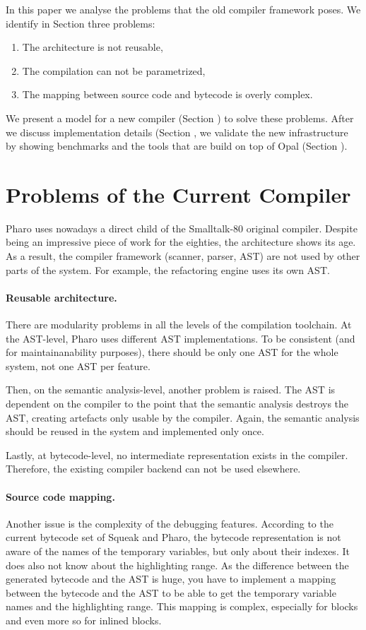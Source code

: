 \documentclass[preprint,10pt]{sigplanconf}
\begin{document}
In this paper we analyse the problems that the old compiler framework poses. We identify in Section  three
problems:
\begin{enumerate}
\item The architecture is not reusable,
\item The compilation can not be parametrized,
\item The mapping between source code and bytecode is overly complex.
\end{enumerate}

We present a model for a new compiler (Section ) to solve these problems. After we discuss implementation details (Section , we validate the new infrastructure by
showing benchmarks and the tools that are build on top of Opal (Section ).


\section{Problems of the Current Compiler}
\label{sec:problem}

Pharo uses nowadays a direct child of the Smalltalk-80 original compiler. Despite being an impressive piece of work for the eighties, the architecture shows its age. As a result, the compiler framework (scanner, parser, AST) are not used by other parts of the system. For example, the refactoring engine uses its own AST.

\paragraph{Reusable architecture.} There are modularity problems in all the levels of the compilation toolchain. At the AST-level, Pharo uses different AST implementations. To be consistent (and for maintainanability purposes), there should be only one AST for the whole system, not one AST per feature. 

Then, on the semantic analysis-level, another problem is raised. The AST is dependent on the compiler to the point that the semantic analysis destroys the AST, creating artefacts only usable by the compiler. Again, the semantic analysis should be reused in the system and implemented only once. 

Lastly, at bytecode-level, no intermediate representation exists in the compiler. Therefore, the existing compiler backend can not be used elsewhere.

\paragraph{Source code mapping.} Another issue is the complexity of the debugging features.
According to the current bytecode set of Squeak and Pharo, the bytecode representation is not aware of the names of the temporary variables, but only about their indexes.
It does also not know about the highlighting range.
As the difference between the generated bytecode and the AST is huge, you have to implement a mapping between the bytecode and the AST to be able to get the temporary variable names and the highlighting range.
This mapping is complex, especially for blocks and even more so for inlined blocks.
\end{document}
